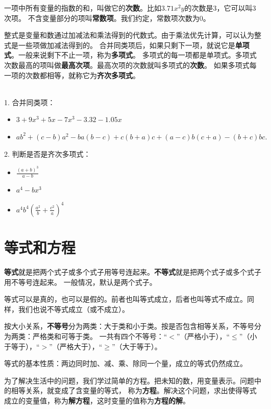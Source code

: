 \documentclass[12pt,UTF8,fontset=none]{ctexbook}
\begin{document}
一项中所有变量的指数的和，叫做它的\textbf{次数}。比如$3.71x^2y$的次数是$3$，它可以叫$3$次项。
不含变量部分的项叫\textbf{常数项}。我们约定，常数项次数为$0$。

整式是变量和数通过加减法和乘法得到的代数式。由于乘法优先计算，可以认为整式是一些项做加减法得到的。
合并同类项后，如果只剩下一项，就说它是\textbf{单项式}。一般来说剩下不止一项，称为\textbf{多项式}。
多项式的每一项都是单项式。多项式次数最高的项叫做\textbf{最高次项}。最高次项的次数就叫多项式的\textbf{次数}。
如果多项式每一项的次数都相等，就称它为\textbf{齐次多项式}。

\begin{xt}\label{xt:1-1-0}
    \mbox{} \\
    1. 合并同类项：\begin{itemize}
        \item $3 + 9x^3 + 5x - 7x^3 - 3.32 - 1.05x$
        \item $ab^2 + (c-b)a^2 - ba(b - c) + c(b + a)c + (a - c)b(c + a) - (b + c)bc.$
    \end{itemize}
    2. 判断是否是齐次多项式：\begin{itemize}
        \item $\frac{(a+b)^3}{a - b}$
        \item $a^4 - bx^3$
        \item $a^4b^4\left(\frac{a^2}{b} + \frac{c^2}{a}\right)^4$
    \end{itemize}
\end{xt}

\section{等式和方程}
\textbf{等式}就是把两个式子或多个式子用等号连起来。\textbf{不等式}就是把两个式子或多个式子用不等号连起来。
一般情况，默认是两个式子。

等式可以是真的，也可以是假的。前者也叫等式成立，后者也叫等式不成立。同样，我们也说不等式成立（或不成立）。

按大小关系，\textbf{不等号}分为两类：大于类和小于类。按是否包含相等关系，不等号分为两类：严格类和可等于类。
一共有四个不等号：“$<$”（严格小于），“$\leqslant$”（小于等于），“$>$”（严格大于），“$\geqslant$”（大于等于）。

等式的基本性质：两边同时加、减、乘、除同一个量，成立的等式仍然成立。

为了解决生活中的问题，我们学过简单的方程。把未知的数，用变量表示。问题中的相等关系，就变成了含变量的等式，
称为\textbf{方程}。解决这个问题，求出使得等式成立的变量值，称为\textbf{解方程}，这时变量的值称为\textbf{方程的解}。
\end{document}
